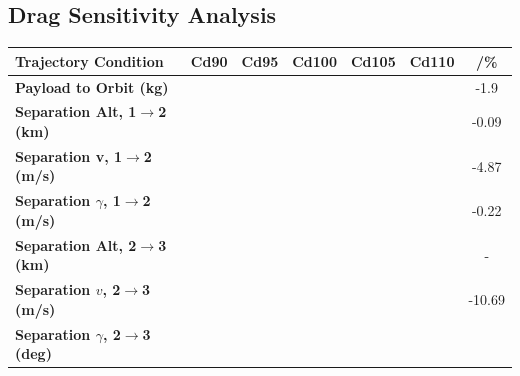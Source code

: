 \subsection{Drag Sensitivity Analysis}\label{sec:dragvariation}

\begin{table}[ht!]
	\centering
	\begin{tabular}{l c c c c c c} 
		\hline \textbf{Trajectory Condition}
		&Cd90
		&Cd95
		&Cd100
		&Cd105
		&Cd110
		& /\%
		\\
		\hline \textbf{Payload to Orbit (kg)}
		& \PayloadToOrbitCdNinetyNoReturn
		& \PayloadToOrbitCdNinetyFiveNoReturn
		& \PayloadToOrbitCdStandardNoReturn
		& \PayloadToOrbitCdOneHundredFiveNoReturn
		& \PayloadToOrbitCdOneHundredTenNoReturn
		&-1.9
		\\
		\textbf{Separation Alt, 1$\rightarrow$2 (km)}
		& \firstsecondSeparationAltCdNinetyNoReturn
		& \firstsecondSeparationAltCdNinetyFiveNoReturn
		& \firstsecondSeparationAltCdStandardNoReturn
		& \firstsecondSeparationAltCdOneHundredFiveNoReturn
		& \firstsecondSeparationAltCdOneHundredTenNoReturn
		&-0.09
		\\
		\textbf{Separation v, 1$\rightarrow$2 (m/s)}
		& \firstsecondSeparationvCdNinetyNoReturn
		& \firstsecondSeparationvCdNinetyFiveNoReturn
		& \firstsecondSeparationvCdStandardNoReturn
		& \firstsecondSeparationvCdOneHundredFiveNoReturn
		& \firstsecondSeparationvCdOneHundredTenNoReturn
		&-4.87
		\\
		\textbf{Separation $\gamma$, 1$\rightarrow$2 (m/s)}
		& \firstsecondSeparationgammaCdNinetyNoReturn
		& \firstsecondSeparationgammaCdNinetyFiveNoReturn
		& \firstsecondSeparationgammaCdStandardNoReturn
		& \firstsecondSeparationgammaCdOneHundredFiveNoReturn
		& \firstsecondSeparationgammaCdOneHundredTenNoReturn
		&-0.22
		\\
		\textbf{Separation Alt, 2$\rightarrow$3 (km)}
		& \secondthirdSeparationAltCdNinetyNoReturn
		& \secondthirdSeparationAltCdNinetyFiveNoReturn
		& \secondthirdSeparationAltCdStandardNoReturn
		& \secondthirdSeparationAltCdOneHundredFiveNoReturn
		& \secondthirdSeparationAltCdOneHundredTenNoReturn
		& -
		\\
		\textbf{Separation $v$, 2$\rightarrow$3 (m/s)}
		& \secondthirdSeparationvCdNinetyNoReturn
		& \secondthirdSeparationvCdNinetyFiveNoReturn
		& \secondthirdSeparationvCdStandardNoReturn
		& \secondthirdSeparationvCdOneHundredFiveNoReturn
		& \secondthirdSeparationvCdOneHundredTenNoReturn
		&-10.69
		\\
		\textbf{Separation $\gamma$, 2$\rightarrow$3 (deg)}

\end{tabular}
\end{table}
